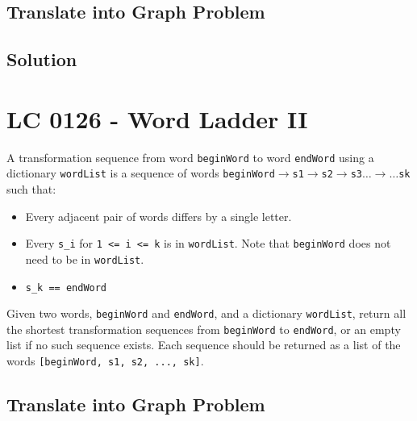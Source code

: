 \subsection*{Translate into Graph Problem}

\subsection*{Solution}

\section{LC 0126 - Word Ladder II}
A transformation sequence from word {\colorbox{CodeBackground}{\lstinline|beginWord|}} to word {\colorbox{CodeBackground}{\lstinline|endWord|}} using a dictionary {\colorbox{CodeBackground}{\lstinline|wordList|}} is a sequence of words {\colorbox{CodeBackground}{\lstinline|beginWord|}}$\rightarrow${\colorbox{CodeBackground}{\lstinline|s1|}}$\rightarrow${\colorbox{CodeBackground}{\lstinline|s2|}}$\rightarrow${\colorbox{CodeBackground}{\lstinline|s3|}}$\dots\rightarrow\dots${\colorbox{CodeBackground}{\lstinline|sk|}} such that:
\begin{itemize}
	\item Every adjacent pair of words differs by a single letter.
	\item Every {\colorbox{CodeBackground}{\lstinline|s_i|}} for {\colorbox{CodeBackground}{\lstinline|1 <= i <= k|}} is in {\colorbox{CodeBackground}{\lstinline|wordList|}}. Note that {\colorbox{CodeBackground}{\lstinline|beginWord|}} does not need to be in {\colorbox{CodeBackground}{\lstinline|wordList|}}.
	\item {\colorbox{CodeBackground}{\lstinline|s_k == endWord|}}
\end{itemize}
Given two words, {\colorbox{CodeBackground}{\lstinline|beginWord|}} and {\colorbox{CodeBackground}{\lstinline|endWord|}}, and a dictionary {\colorbox{CodeBackground}{\lstinline|wordList|}}, return all the shortest transformation sequences from {\colorbox{CodeBackground}{\lstinline|beginWord|}} to {\colorbox{CodeBackground}{\lstinline|endWord|}}, or an empty list if no such sequence exists. Each sequence should be returned as a list of the words {\colorbox{CodeBackground}{\lstinline|[beginWord, s1, s2, ..., sk]|}}.

\subsection*{Translate into Graph Problem}

